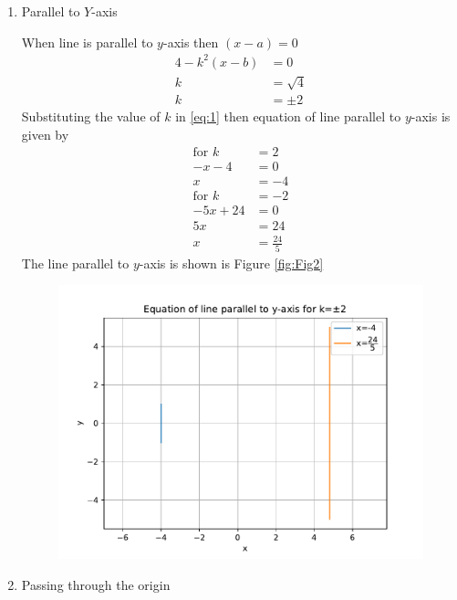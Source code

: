 \documentclass[12pt]{article}
\providecommand{\brak}[1]{\ensuremath{\left(#1\right)}}
\begin{document}
\begin{enumerate}
\begin{enumerate}
\item Parallel to $Y$-axis

When line is parallel to $y$-axis then $(x-a)=0$
\begin{align}
        4-k^2 \brak{x-b} &=0\\
        k &=\sqrt{4}\\
        k &= \pm 2
\end{align}
Substituting the value of $k$ in \eqref{eq:1} then equation of line parallel to $y$-axis is given by
\begin{align}
\text{for } k &=2\\
        -x-4 &=0\\
        x &=-4\\
\text{for } k &=-2\\
        -5x+24 &=0\\
        5x &=24\\
        x &= \frac{24}{5}
\end{align}
The line parallel to $y$-axis is shown is Figure \eqref{fig:Fig2}

\begin{figure}[!h]
\begin{center}
\includegraphics[width=\columnwidth]{figs/fig2.pdf}
\end{center}
\caption{}
\label{fig:Fig2}
\end{figure}

\item Passing through the origin


\end{enumerate}
\end{enumerate}
\end{document}

